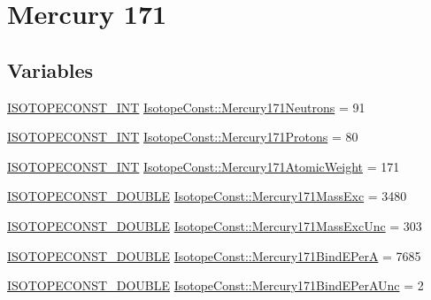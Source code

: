 \hypertarget{group___isotope_const-_mercury-_hg171}{}\section{Mercury 171}
\label{group___isotope_const-_mercury-_hg171}
\subsection*{Variables}
\begin{DoxyCompactItemize}
\item 
\mbox{\hyperlink{group___isotope_const-_macros_ga5f18360b3e99483a35c32d789e62621c}{I\+S\+O\+T\+O\+P\+E\+C\+O\+N\+S\+T\+\_\+\+I\+NT}} \mbox{\hyperlink{group___isotope_const-_mercury-_hg171_ga8ca9eb58ac913a859ecb2240cea53a12}{Isotope\+Const\+::\+Mercury171\+Neutrons}} = 91
\item 
\mbox{\hyperlink{group___isotope_const-_macros_ga5f18360b3e99483a35c32d789e62621c}{I\+S\+O\+T\+O\+P\+E\+C\+O\+N\+S\+T\+\_\+\+I\+NT}} \mbox{\hyperlink{group___isotope_const-_mercury-_hg171_ga9aec4015a98114c6dfc43f00d72edab7}{Isotope\+Const\+::\+Mercury171\+Protons}} = 80
\item 
\mbox{\hyperlink{group___isotope_const-_macros_ga5f18360b3e99483a35c32d789e62621c}{I\+S\+O\+T\+O\+P\+E\+C\+O\+N\+S\+T\+\_\+\+I\+NT}} \mbox{\hyperlink{group___isotope_const-_mercury-_hg171_ga85bf54d404c2cf19e8b66059b2b72a23}{Isotope\+Const\+::\+Mercury171\+Atomic\+Weight}} = 171
\item 
\mbox{\hyperlink{group___isotope_const-_macros_ga8f45a7272ce02c0b4c65c44636ed719a}{I\+S\+O\+T\+O\+P\+E\+C\+O\+N\+S\+T\+\_\+\+D\+O\+U\+B\+LE}} \mbox{\hyperlink{group___isotope_const-_mercury-_hg171_ga7939b3984557d5068cc07782461bcd7f}{Isotope\+Const\+::\+Mercury171\+Mass\+Exc}} = 3480
\item 
\mbox{\hyperlink{group___isotope_const-_macros_ga8f45a7272ce02c0b4c65c44636ed719a}{I\+S\+O\+T\+O\+P\+E\+C\+O\+N\+S\+T\+\_\+\+D\+O\+U\+B\+LE}} \mbox{\hyperlink{group___isotope_const-_mercury-_hg171_ga0290113c34daad1b32880ee0541fd103}{Isotope\+Const\+::\+Mercury171\+Mass\+Exc\+Unc}} = 303
\item 
\mbox{\hyperlink{group___isotope_const-_macros_ga8f45a7272ce02c0b4c65c44636ed719a}{I\+S\+O\+T\+O\+P\+E\+C\+O\+N\+S\+T\+\_\+\+D\+O\+U\+B\+LE}} \mbox{\hyperlink{group___isotope_const-_mercury-_hg171_ga26805b83973e1b9b1f0402488544733b}{Isotope\+Const\+::\+Mercury171\+Bind\+E\+PerA}} = 7685
\item 
\mbox{\hyperlink{group___isotope_const-_macros_ga8f45a7272ce02c0b4c65c44636ed719a}{I\+S\+O\+T\+O\+P\+E\+C\+O\+N\+S\+T\+\_\+\+D\+O\+U\+B\+LE}} \mbox{\hyperlink{group___isotope_const-_mercury-_hg171_gaf23e2438fbe6ba156dc9df3162bf984a}{Isotope\+Const\+::\+Mercury171\+Bind\+E\+Per\+A\+Unc}} = 2

\end{DoxyCompactItemize}
